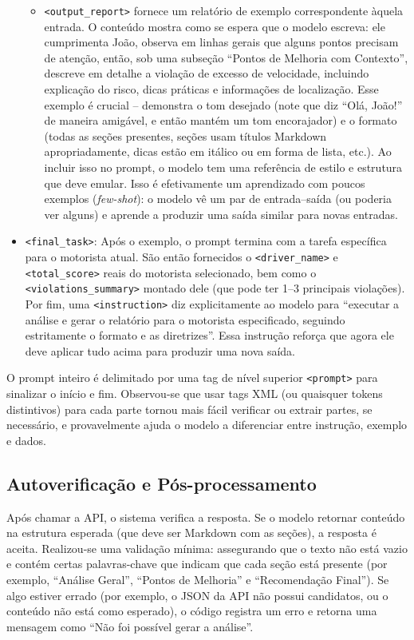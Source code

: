 \documentclass[12pt]{article}
\begin{document}
\begin{itemize}
\begin{itemize}
        \item \verb|<output_report>| fornece um relatório de exemplo correspondente àquela entrada. O conteúdo mostra como se espera que o modelo escreva: ele cumprimenta João, observa em linhas gerais que alguns pontos precisam de atenção, então, sob uma subseção “Pontos de Melhoria com Contexto”, descreve em detalhe a violação de excesso de velocidade, incluindo explicação do risco, dicas práticas e informações de localização. Esse exemplo é crucial – demonstra o tom desejado (note que diz “Olá, João!” de maneira amigável, e então mantém um tom encorajador) e o formato (todas as seções presentes, seções usam títulos Markdown apropriadamente, dicas estão em itálico ou em forma de lista, etc.). Ao incluir isso no prompt, o modelo tem uma referência de estilo e estrutura que deve emular. Isso é efetivamente um aprendizado com poucos exemplos (\textit{few-shot}): o modelo vê um par de entrada–saída (ou poderia ver alguns) e aprende a produzir uma saída similar para novas entradas.
    \end{itemize}
    \item \verb|<final_task>|: Após o exemplo, o prompt termina com a tarefa específica para o motorista atual. São então fornecidos o \verb|<driver_name>| e \verb|<total_score>| reais do motorista selecionado, bem como o \verb|<violations_summary>| montado dele (que pode ter 1–3 principais violações). Por fim, uma \verb|<instruction>| diz explicitamente ao modelo para “executar a análise e gerar o relatório para o motorista especificado, seguindo estritamente o formato e as diretrizes”. Essa instrução reforça que agora ele deve aplicar tudo acima para produzir uma nova saída.
\end{itemize}
O prompt inteiro é delimitado por uma tag de nível superior \verb|<prompt>| para sinalizar o início e fim. Observou-se que usar tags XML (ou quaisquer tokens distintivos) para cada parte tornou mais fácil verificar ou extrair partes, se necessário, e provavelmente ajuda o modelo a diferenciar entre instrução, exemplo e dados.




\subsection{Autoverificação e Pós-processamento}

Após chamar a API, o sistema verifica a resposta. Se o modelo retornar conteúdo na estrutura esperada (que deve ser Markdown com as seções), a resposta é aceita. Realizou-se uma validação mínima: assegurando que o texto não está vazio e contém certas palavras-chave que indicam que cada seção está presente (por exemplo, “Análise Geral”, “Pontos de Melhoria” e “Recomendação Final”). Se algo estiver errado (por exemplo, o JSON da API não possui candidatos, ou o conteúdo não está como esperado), o código registra um erro e retorna uma mensagem como “Não foi possível gerar a análise”. 
\end{document}

